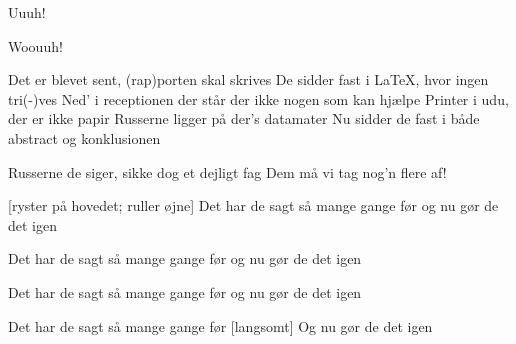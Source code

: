 \documentclass[a4paper,11pt]{article}
\begin{document}
\begin{song}
 Uuuh!


 Woouuh!

 Det er blevet sent, (rap)porten skal skrives
De sidder fast i \LaTeX, hvor ingen tri(-)ves
Ned' i receptionen der står der ikke nogen som kan hjælpe
Printer i udu, der er ikke papir
Russerne ligger på der's datamater
Nu sidder de fast i både abstract og konklusionen

 Russerne de siger, sikke dog et dejligt fag
Dem må vi tag nog'n flere af!

[ryster på hovedet; ruller øjne] Det har de sagt så mange gange før
og nu gør de det igen

 Det har de sagt så mange gange før
og nu gør de det igen 

 Det har de sagt så mange gange før
og nu gør de det igen 

 Det har de sagt så mange gange før
[langsomt] Og nu gør de det igen 

\end{song}
\end{document}
